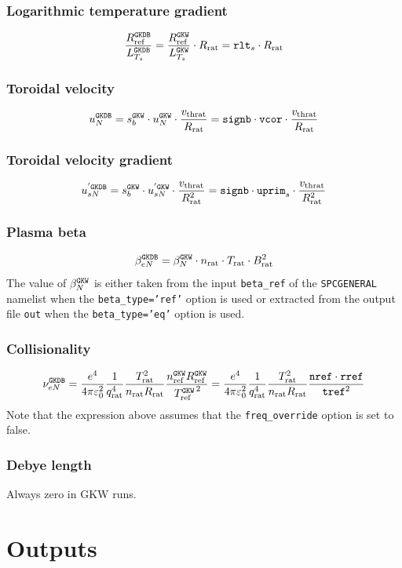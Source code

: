 \documentclass[a4paper]{report}
\begin{document}
\subsection{Logarithmic temperature gradient}
\begin{equation}
\frac{R_{\textrm{ref}}^{\texttt{GKDB}}}{L_{T_s}^{\texttt{GKDB}}} =  \frac{R_{\textrm{ref}}^{\texttt{GKW}}}{L_{T_s}^{\texttt{GKW}}} \cdot R_\textrm{rat} = \texttt{rlt}_s \cdot R_\textrm{rat}
\end{equation}

\subsection{Toroidal velocity}
\begin{equation}
u_N^{\texttt{GKDB}} = s_b^{\texttt{GKW}}\cdot u_N^{\texttt{GKW}} \cdot \frac{v_\textrm{thrat}}{R_\textrm{rat}}  = \texttt{signb} \cdot \texttt{vcor} \cdot \frac{v_\textrm{thrat}}{R_\textrm{rat}}
\end{equation}

\subsection{Toroidal velocity gradient}
\begin{equation}
u^{'\texttt{GKDB}}_{sN} = s_b^{\texttt{GKW}}\cdot  u^{'\texttt{GKW}}_{sN} \cdot \frac{v_\textrm{thrat}}{R_\textrm{rat}^2} = \texttt{signb} \cdot \texttt{uprim}_s \cdot \frac{v_\textrm{thrat}}{R_\textrm{rat}^2}
\end{equation}

\subsection{Plasma beta}
\begin{equation}
\beta_{eN}^{\texttt{GKDB}} = \beta_N^{\texttt{GKW}} \cdot n_\textrm{rat} \cdot T_\textrm{rat} \cdot B_\textrm{rat}^2 
\end{equation}
The value of $\beta_N^{\texttt{GKW}}$ is either taken from the input \texttt{beta\_ref} of the \texttt{SPCGENERAL} namelist when the  \texttt{beta\_type='ref'} option is used or extracted from the output file \texttt{out} when the  \texttt{beta\_type='eq'} option is used.
 
\subsection{Collisionality}
\begin{equation}
\nu_{eN}^{\texttt{GKDB}} = \frac{e^4}{4\pi\varepsilon_0^2}\frac{1}{q_\textrm{rat}^4}\frac{T_\textrm{rat}^2}{n_\textrm{rat}R_\textrm{rat}}\frac{n_{\textrm{ref}}^{\texttt{GKW}} R_{\textrm{ref}}^{\texttt{GKW}}}{\left.T_{\textrm{ref}}^{\texttt{GKW}}\right.^2} = \frac{e^4}{4\pi\varepsilon_0^2}\frac{1}{q_\textrm{rat}^4}\frac{T_\textrm{rat}^2}{n_\textrm{rat}R_\textrm{rat}} \frac{\texttt{nref}\cdot\texttt{rref}}{\texttt{tref}^2}
\end{equation}
Note that the expression above assumes that the \texttt{freq\_override} option is set to false. 

\subsection{Debye length}
Always zero in GKW runs.

\chapter{Outputs}



\end{document}

